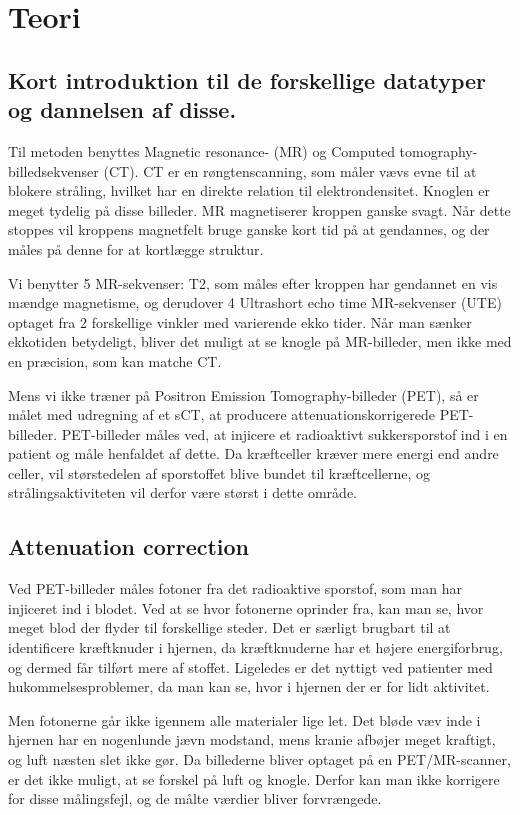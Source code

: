 \section{Teori}
\subsection{Kort introduktion til de forskellige datatyper og dannelsen af disse.}


Til metoden benyttes Magnetic resonance- (MR) og Computed
tomography-billedsekvenser (CT). CT er en røngtenscanning, som måler
vævs evne til at blokere stråling, hvilket har en direkte relation
til elektrondensitet. Knoglen er meget tydelig på disse billeder. MR
magnetiserer kroppen ganske svagt. Når dette stoppes vil kroppens
magnetfelt bruge ganske kort tid på at gendannes, og der måles på
denne for at kortlægge struktur.

Vi benytter 5 MR-sekvenser: T2, som måles efter kroppen har gendannet en vis
mændge magnetisme, og derudover 4 Ultrashort echo time MR-sekvenser (UTE)
optaget fra 2 forskellige vinkler med varierende ekko tider. Når man sænker ekkotiden betydeligt, bliver det muligt at se knogle på MR-billeder, men ikke med
en præcision, som kan matche CT.

Mens vi ikke træner på Positron Emission Tomography-billeder (PET), så
er målet med udregning af et sCT, at producere attenuationskorrigerede
PET-billeder. PET-billeder måles ved, at injicere et radioaktivt
sukkersporstof ind i en patient og måle henfaldet af dette. Da
kræftceller kræver mere energi end andre celler, vil størstedelen af
sporstoffet blive bundet til kræftcellerne, og strålingsaktiviteten
vil derfor være størst i dette område.

\subsection{Attenuation correction} 

Ved PET-billeder måles fotoner fra det radioaktive sporstof, som man
har injiceret ind i blodet. Ved at se hvor fotonerne oprinder fra, kan
man se, hvor meget blod der flyder til forskellige steder. Det er særligt
brugbart til at identificere kræftknuder i hjernen, da kræftknuderne har
et højere energiforbrug, og dermed får tilført mere af stoffet. Ligeledes er det nyttigt ved patienter med
hukommelsesproblemer, da man kan se, hvor i hjernen der er for lidt
aktivitet.

Men fotonerne går ikke igennem alle materialer lige let. Det bløde væv
inde i hjernen har en nogenlunde jævn modstand, mens kranie afbøjer
meget kraftigt, og luft næsten slet ikke gør. Da billederne bliver
optaget på en PET/MR-scanner, er det ikke muligt, at se forskel på luft
og knogle. Derfor kan man ikke korrigere for disse målingsfejl, og de
målte værdier bliver forvrængede.

